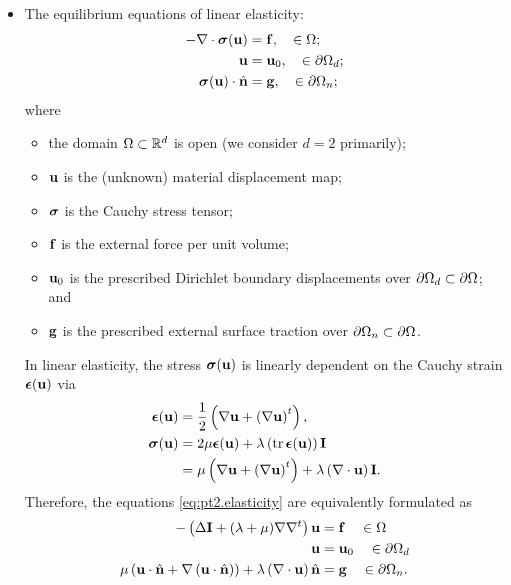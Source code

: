 \begin{itemize}
\item The equilibrium equations of linear elasticity:
\begin{subequations} \label{eq:pt2.elasticity}
\begin{align}
-\nabla \cdot \boldsymbol{\sigma}(\mathbf{u}) & = \mathbf{f}, \quad \in \Omega; \\
\mathbf{u} & = \mathbf{u}_0, \quad \in \partial\Omega_d; \\
\boldsymbol{\sigma}(\mathbf{u}) \cdot \hat{\mathbf{n}} & = \mathbf{g}, \quad \in \partial\Omega_n;
\end{align}
\end{subequations}
where
\begin{itemize}
\item the domain $\Omega \subset \mathbb{R}^d$ is open (we consider $d = 2$ primarily);
\item $\mathbf{u}$ is the (unknown) material displacement map;
\item $\boldsymbol{\sigma}$ is the Cauchy stress tensor;
\item $\mathbf{f}$ is the external force per unit volume;
\item $\mathbf{u}_0$ is the prescribed Dirichlet boundary displacements over $\partial\Omega_d \subset \partial\Omega$; and
\item $\mathbf{g}$ is the prescribed external surface traction over $\partial\Omega_n \subset \partial\Omega$.
\end{itemize}
In linear elasticity, the stress $\boldsymbol{\sigma}(\mathbf{u})$ is linearly dependent on the Cauchy strain $\boldsymbol{\epsilon}(\mathbf{u})$ via
\begin{align*}
\boldsymbol{\epsilon}(\mathbf{u}) & = \frac{1}{2} \left( \nabla \mathbf{u} + \left( \nabla \mathbf{u} \right)^t \right), \\
\boldsymbol{\sigma}(\mathbf{u})   & = 2 \mu \boldsymbol{\epsilon}(\mathbf{u}) + \lambda \left( \operatorname{tr} \boldsymbol{\epsilon}(\mathbf{u}) \right) \mathbf{I} \\
                 & = \mu \left( \nabla \mathbf{u} + \left( \nabla \mathbf{u} \right)^t \right) + \lambda \left( \nabla \cdot \mathbf{u} \right) \mathbf{I}.
\end{align*}
Therefore, the equations \eqref{eq:pt2.elasticity} are equivalently formulated as
\begin{subequations} \label{eq:pt2.LE}
\begin{align}
-\left( \Delta \mathbf{I} + (\lambda + \mu) \nabla \nabla^t \right) \mathbf{u} & = \mathbf{f} \quad \in \Omega \label{eq:pt2.LE.PDE} \\
\mathbf{u} & = \mathbf{u}_0 \quad \in \partial\Omega_d \label{eq:pt2.LE.D} \\
\mu \left( \mathbf{u} \cdot \hat{\mathbf{n}} + \nabla \left( \mathbf{u} \cdot \hat{\mathbf{n}} \right) \right) + \lambda \left( \nabla \cdot \mathbf{u} \right) \hat{\mathbf{n}} & = \mathbf{g} \quad \in \partial\Omega_n \label{eq:pt2.LE.N}.
\end{align}
\end{subequations}

\end{itemize}

